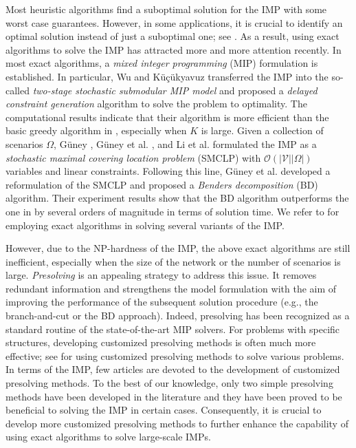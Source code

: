 \documentclass[a4paper,10pt]{article}
\theoremstyle{plain}
\newcommand{\rev}[1]{{\color{black}#1}}
\newcommand{\revv}[1]{{#1}}
\begin{document}
	Most heuristic algorithms find a suboptimal solution for the IMP with some worst case  guarantees.
	However, in some applications, it is crucial to identify an optimal solution instead of just a suboptimal one; see \cite{Guney2019}.
	As a result, using exact algorithms to solve the IMP has attracted more and more attention recently.
	{In most exact algorithms, a \emph{mixed integer programming} (MIP) formulation is established.}
	In particular, Wu and K{\"u}{\c{c}}{\"u}kyavuz \cite{Wu2017} transferred the IMP into the so-called \emph{two-stage stochastic submodular MIP model} and proposed a \emph{delayed constraint generation} algorithm to solve the problem to optimality.
	The computational results indicate that their algorithm is more efficient than the basic greedy algorithm in \cite{Kempe2003}, especially when $K$ is large.
	\rev{Given a collection of scenarios $\Omega$, G\"uney \cite{Guney2019}, G\"uney et al. \cite{Guney2020}, and Li et al. \cite{Li2019} formulated the IMP as a \emph{stochastic maximal covering location problem} (SMCLP) with $\mathcal{O}(|\mathcal{V}||\Omega|)$ variables and linear constraints.}
	Following this line, G\"{u}ney et al. \cite{Guney2020} developed a reformulation of the SMCLP and proposed a {\emph{Benders decomposition}} (BD) algorithm.
	Their experiment results show that the BD algorithm outperforms the one in \cite{Wu2017} by several orders of magnitude in terms of solution time.
	We refer to \cite{Fischetti2018,Gunnec2020,Kahr2020,kahr2022impact,Reghavan2019} for employing exact algorithms in solving several variants of the IMP.
	
	
	However, due to the NP-hardness of the IMP, the above exact algorithms are still inefficient, especially when the size of the \revv{network} or the number of scenarios is large. 
	\emph{Presolving} \cite{Gurobipresolve} is an appealing strategy to address this issue. 
	It removes redundant information and strengthens the model formulation with the aim of improving the performance of the subsequent solution procedure (e.g., the branch-and-cut or the BD approach).
	Indeed, presolving has been recognized as a standard routine of the state-of-the-art MIP solvers.
	For problems with specific structures, developing customized presolving methods is often much more effective; see \cite{Borndorfer1998,Church2003,Heinz2013,Ljubic2012presolve} for using customized presolving methods to solve various problems. 
	In terms of the IMP, few articles are devoted to \revv{the development of} customized presolving methods.
	To the best of our knowledge, only two simple presolving methods have been developed in the literature \cite{Guney2020,Kahr2020} and they have been proved to be beneficial to solving the IMP in certain cases.
	\rev{Consequently, it is crucial to develop more customized presolving methods to further enhance the capability of using exact algorithms to solve large-scale IMPs.}
	
\end{document}
